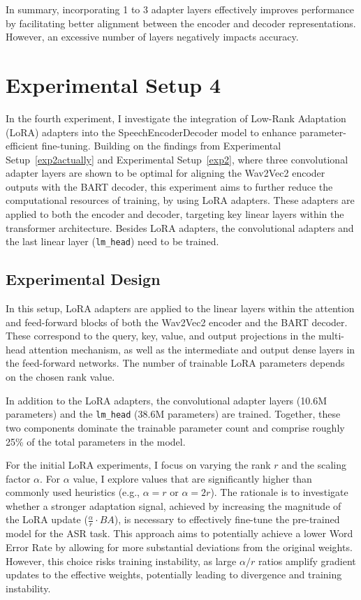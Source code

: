 In summary, incorporating 1 to 3 adapter layers effectively improves performance by facilitating better alignment between the encoder and decoder representations. However, an excessive number of layers negatively impacts accuracy.


\section{Experimental Setup 4}
\label{experiment-3}

In the fourth experiment, I investigate the integration of Low-Rank Adaptation (LoRA) adapters \cite{hu2021lora} into the SpeechEncoderDecoder model to enhance parameter-efficient fine-tuning. Building on the findings from Experimental Setup~\ref{exp2actually} and Experimental Setup~\ref{exp2}, where three convolutional adapter layers are shown to be optimal for aligning the Wav2Vec2 encoder outputs with the BART decoder, this experiment aims to further reduce the computational resources of training, by using LoRA adapters. These adapters are applied to both the encoder and decoder, targeting key linear layers within the transformer architecture. Besides LoRA adapters, the convolutional adapters and the last linear layer (\texttt{lm\_head}) need to be trained.


\subsection{Experimental Design}

In this setup, LoRA adapters are applied to the linear layers within the attention and feed-forward blocks of both the Wav2Vec2 encoder and the BART decoder. These correspond to the query, key, value, and output projections in the multi-head attention mechanism, as well as the intermediate and output dense layers in the feed-forward networks. The number of trainable LoRA parameters depends on the chosen rank value. 

In addition to the LoRA adapters, the convolutional adapter layers (10.6M parameters) and the \texttt{lm\_head} (38.6M parameters) are trained. Together, these two components dominate the trainable parameter count and comprise roughly 25\% of the total parameters in the model.

For the initial LoRA experiments, I focus on varying the rank \( r \) and the scaling factor \( \alpha \). For \( \alpha \) value, I explore values that are significantly higher than commonly used heuristics (e.g., $\alpha = r$ or $\alpha = 2r$). The rationale is to investigate whether a stronger adaptation signal, achieved by increasing the magnitude of the LoRA update ($\frac{\alpha}{r} \cdot BA$), is necessary to effectively fine-tune the pre-trained model for the ASR task. This approach aims to potentially achieve a lower Word Error Rate by allowing for more substantial deviations from the original weights. However, this choice risks training instability, as large \( \alpha / r \) ratios amplify gradient updates to the effective weights, potentially leading to divergence and training instability.

